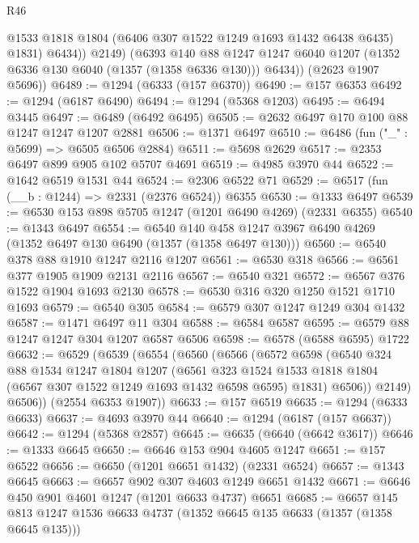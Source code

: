 \begin{lexlean}{R46}
\begin{coremodule}
                @1533
                @1818
                @1804
                (@6406 @307 @1522 @1249 @1693 @1432 @6438 @6435)
                @1831)
              @6434))
          @2149)
        (@6393
          @140
          @88
          @1247
          @1247
          @6040
          @1207
          (@1352 @6336 @130 @6040 (@1357 (@1358 @6336 @130)))
          @6434))
      (@2623 @1907 @5696))
@6489 := @1294 (@6333 (@157 @6370))
@6490 := @157 @6353
@6492 := @1294 (@6187 @6490)
@6494 := @1294 (@5368 @1203)
@6495 := @6494 @3445
@6497 := @6489 (@6492 @6495)
@6505 := @2632 @6497 @170 @100 @88 @1247 @1247 @1207 @2881
@6506 := @1371 @6497
@6510 := @6486 (fun ("_" : @5699) => @6505 @6506 @2884)
@6511 := @5698 @2629
@6517 := @2353 @6497 @899 @905 @102 @5707 @4691
@6519 := @4985 @3970 @44
@6522 := @1642 @6519 @1531 @44
@6524 := @2306 @6522 @71
@6529 := @6517 (fun (__b : @1244) => @2331 (@2376 @6524)) @6355
@6530 := @1333 @6497
@6539 := @6530 @153 @898 @5705 @1247 (@1201 @6490 @4269) (@2331 @6355)
@6540 := @1343 @6497
@6554 := @6540 @140 @458 @1247 @3967 @6490 @4269 (@1352 @6497 @130 @6490 (@1357 (@1358 @6497 @130)))
@6560 := @6540 @378 @88 @1910 @1247 @2116 @1207
@6561 := @6530 @318
@6566 := @6561 @377 @1905 @1909 @2131 @2116
@6567 := @6540 @321
@6572 := @6567 @376 @1522 @1904 @1693 @2130
@6578 := @6530 @316 @320 @1250 @1521 @1710 @1693
@6579 := @6540 @305
@6584 := @6579 @307 @1247 @1249 @304 @1432
@6587 := @1471 @6497 @11 @304
@6588 := @6584 @6587
@6595 := @6579 @88 @1247 @1247 @304 @1207 @6587 @6506
@6598 := @6578 (@6588 @6595) @1722
@6632 := @6529
    (@6539
      (@6554
        (@6560
          (@6566
            (@6572
              @6598
              (@6540
                @324
                @88
                @1534
                @1247
                @1804
                @1207
                (@6561
                  @323
                  @1524
                  @1533
                  @1818
                  @1804
                  (@6567 @307 @1522 @1249 @1693 @1432 @6598 @6595)
                  @1831)
                @6506))
            @2149)
          @6506))
      (@2554 @6353 @1907))
@6633 := @157 @6519
@6635 := @1294 (@6333 @6633)
@6637 := @4693 @3970 @44
@6640 := @1294 (@6187 (@157 @6637))
@6642 := @1294 (@5368 @2857)
@6645 := @6635 (@6640 (@6642 @3617))
@6646 := @1333 @6645
@6650 := @6646 @153 @904 @4605 @1247
@6651 := @157 @6522
@6656 := @6650 (@1201 @6651 @1432) (@2331 @6524)
@6657 := @1343 @6645
@6663 := @6657 @902 @307 @4603 @1249 @6651 @1432
@6671 := @6646 @450 @901 @4601 @1247 (@1201 @6633 @4737) @6651
@6685 := @6657 @145 @813 @1247 @1536 @6633 @4737 (@1352 @6645 @135 @6633 (@1357 (@1358 @6645 @135)))

\end{coremodule}
\end{lexlean}
